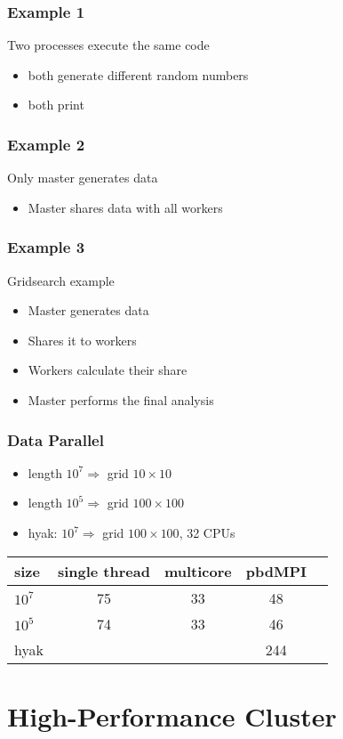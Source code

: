 \documentclass[pdftex]{beamer}
\begin{document}
\begin{frame}
  \frametitle{Example 1}
  Two processes execute the same code
  \begin{itemize}
  \item both generate different random numbers
  \item both print
  \end{itemize}
\end{frame}

\begin{frame}
  \frametitle{Example 2}
  Only master generates data
  \begin{itemize}
  \item Master shares data with all workers
  \end{itemize}
\end{frame}

\begin{frame}
  \frametitle{Example 3}
  Gridsearch example
  \begin{itemize}
  \item Master generates data
  \item Shares it to workers
  \item Workers calculate their share
  \item Master performs the final analysis
  \end{itemize}
\end{frame}

\begin{frame}
  \frametitle{Data Parallel}
  \begin{itemize}
  \item length $10^{7} \Rightarrow$ grid $10\times10$
  \item length $10^{5} \Rightarrow$ grid $100\times100$
  \item hyak:  $10^{7} \Rightarrow$ grid $100\times100$, 32 CPUs
  \end{itemize}
  \begin{tabular}{l cccc}
    \toprule
    size      & single thread & multicore & pbdMPI\\
    \midrule
    $10^{7}$  & 75            & 33        & 48     \\
    $10^{5}$  & 74            & 33        & 46    \\
    hyak      &               &           & 244 \\
    \bottomrule
  \end{tabular}
\end{frame}

\section[HPC]{High-Performance Cluster}
\end{document}
